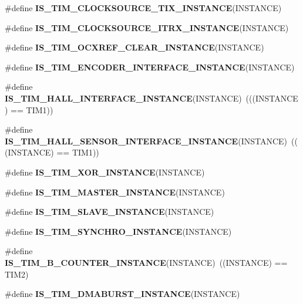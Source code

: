 \begin{DoxyCompactItemize}
\item 
\#define {\bfseries I\+S\+\_\+\+T\+I\+M\+\_\+\+C\+L\+O\+C\+K\+S\+O\+U\+R\+C\+E\+\_\+\+T\+I\+X\+\_\+\+I\+N\+S\+T\+A\+N\+CE}(I\+N\+S\+T\+A\+N\+CE)
\item 
\#define {\bfseries I\+S\+\_\+\+T\+I\+M\+\_\+\+C\+L\+O\+C\+K\+S\+O\+U\+R\+C\+E\+\_\+\+I\+T\+R\+X\+\_\+\+I\+N\+S\+T\+A\+N\+CE}(I\+N\+S\+T\+A\+N\+CE)
\item 
\#define {\bfseries I\+S\+\_\+\+T\+I\+M\+\_\+\+O\+C\+X\+R\+E\+F\+\_\+\+C\+L\+E\+A\+R\+\_\+\+I\+N\+S\+T\+A\+N\+CE}(I\+N\+S\+T\+A\+N\+CE)
\item 
\#define {\bfseries I\+S\+\_\+\+T\+I\+M\+\_\+\+E\+N\+C\+O\+D\+E\+R\+\_\+\+I\+N\+T\+E\+R\+F\+A\+C\+E\+\_\+\+I\+N\+S\+T\+A\+N\+CE}(I\+N\+S\+T\+A\+N\+CE)
\item 
\mbox{\label{group___exported__macro_gacdcc047699e2d83c9d2b3a3f8375dff4}} 
\#define {\bfseries I\+S\+\_\+\+T\+I\+M\+\_\+\+H\+A\+L\+L\+\_\+\+I\+N\+T\+E\+R\+F\+A\+C\+E\+\_\+\+I\+N\+S\+T\+A\+N\+CE}(I\+N\+S\+T\+A\+N\+CE)~(((I\+N\+S\+T\+A\+N\+CE) == T\+I\+M1))
\item 
\mbox{\label{group___exported__macro_ga979ea18ba0931f5ed15cc2f3ac84794b}} 
\#define {\bfseries I\+S\+\_\+\+T\+I\+M\+\_\+\+H\+A\+L\+L\+\_\+\+S\+E\+N\+S\+O\+R\+\_\+\+I\+N\+T\+E\+R\+F\+A\+C\+E\+\_\+\+I\+N\+S\+T\+A\+N\+CE}(I\+N\+S\+T\+A\+N\+CE)~(((I\+N\+S\+T\+A\+N\+CE) == T\+I\+M1))
\item 
\#define {\bfseries I\+S\+\_\+\+T\+I\+M\+\_\+\+X\+O\+R\+\_\+\+I\+N\+S\+T\+A\+N\+CE}(I\+N\+S\+T\+A\+N\+CE)
\item 
\#define {\bfseries I\+S\+\_\+\+T\+I\+M\+\_\+\+M\+A\+S\+T\+E\+R\+\_\+\+I\+N\+S\+T\+A\+N\+CE}(I\+N\+S\+T\+A\+N\+CE)
\item 
\#define {\bfseries I\+S\+\_\+\+T\+I\+M\+\_\+\+S\+L\+A\+V\+E\+\_\+\+I\+N\+S\+T\+A\+N\+CE}(I\+N\+S\+T\+A\+N\+CE)
\item 
\#define {\bfseries I\+S\+\_\+\+T\+I\+M\+\_\+\+S\+Y\+N\+C\+H\+R\+O\+\_\+\+I\+N\+S\+T\+A\+N\+CE}(I\+N\+S\+T\+A\+N\+CE)
\item 
\mbox{\label{group___exported__macro_gac41867bf288927ff8ff10a85e67a591b}} 
\#define {\bfseries I\+S\+\_\+\+T\+I\+M\+\_\+B\+\_\+\+C\+O\+U\+N\+T\+E\+R\+\_\+\+I\+N\+S\+T\+A\+N\+CE}(I\+N\+S\+T\+A\+N\+CE)~((I\+N\+S\+T\+A\+N\+CE) == T\+I\+M2)
\item 
\#define {\bfseries I\+S\+\_\+\+T\+I\+M\+\_\+\+D\+M\+A\+B\+U\+R\+S\+T\+\_\+\+I\+N\+S\+T\+A\+N\+CE}(I\+N\+S\+T\+A\+N\+CE)

\end{DoxyCompactItemize}
